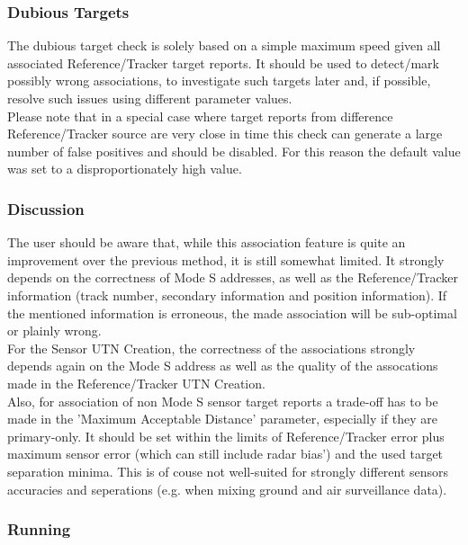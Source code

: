 \subsubsection{Dubious Targets}

The dubious target check is solely based on a simple maximum speed given all associated Reference/Tracker target reports. It should be used to detect/mark possibly wrong associations, to investigate such targets later and, if possible, resolve such issues using different parameter values. \\

Please note that in a special case where target reports from difference Reference/Tracker source are very close in time this check can generate a large number of false positives and should be disabled. For this reason the default value was set to a disproportionately high value.

\subsubsection{Discussion}

The user should be aware that, while this association feature is quite an improvement over the previous method, it is still somewhat limited. It strongly depends on the correctness of Mode S addresses, as well as the Reference/Tracker information (track number, secondary information and position information). If the mentioned information is erroneous, the made association will be sub-optimal or plainly wrong. \\

For the Sensor UTN Creation, the correctness of the associations strongly depends again on the Mode S address as well as the quality of the assocations made in the Reference/Tracker UTN Creation. \\

Also, for association of non Mode S sensor target reports a trade-off has to be made in the 'Maximum Acceptable Distance' parameter, especially if they are primary-only. It should be set within the limits of Reference/Tracker error plus maximum sensor error (which can still include radar bias') and the used target separation minima. This is of couse not well-suited for strongly different sensors accuracies and seperations (e.g. when mixing ground and air surveillance data). \\

\subsubsection{Running}

